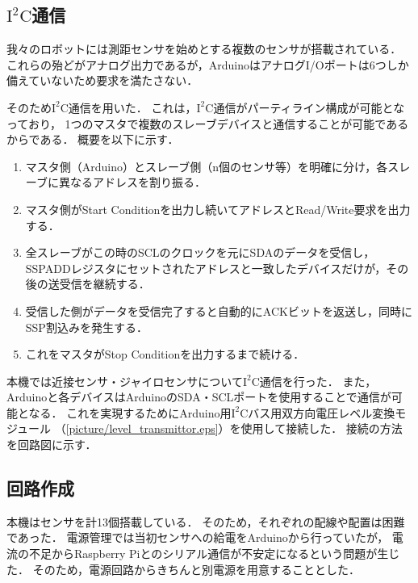 \documentclass[11pt,a4]{jsarticle}
\begin{document}

  \subsection{$\mathrm{I^2C}$通信}
    我々のロボットには測距センサを始めとする複数のセンサが搭載されている．
    これらの殆どがアナログ出力であるが，ArduinoはアナログI/Oポートは6つしか備えていないため要求を満たさない．

    そのため$\mathrm{I^2C}$通信を用いた．
    これは，$\mathrm{I^2C}$通信がパーティライン構成が可能となっており，
    1つのマスタで複数のスレーブデバイスと通信することが可能であるからである．
    概要を以下に示す．
    \begin{enumerate}
      \item マスタ側（Arduino）とスレーブ側（n個のセンサ等）を明確に分け，各スレーブに異なるアドレスを割り振る．
      \item マスタ側がStart Conditionを出力し続いてアドレスとRead/Write要求を出力する．
      \item 全スレーブがこの時のSCLのクロックを元にSDAのデータを受信し，SSPADDレジスタにセットされたアドレスと一致したデバイスだけが，その後の送受信を継続する．
      \item 受信した側がデータを受信完了すると自動的にACKビットを返送し，同時にSSP割込みを発生する．
      \item これをマスタがStop Conditionを出力するまで続ける．
    \end{enumerate}

    本機では近接センサ・ジャイロセンサについて$\mathrm{I^2C}$通信を行った．
    また，Arduinoと各デバイスはArduinoのSDA・SCLポートを使用することで通信が可能となる．
    これを実現するためにArduino用$\mathrm{I^2C}$バス用双方向電圧レベル変換モジュール
    （\ref{picture/level_transmittor.eps}）を使用して接続した．
    接続の方法を回路図に示す．


  \subsection{回路作成}
    本機はセンサを計13個搭載している．
    そのため，それぞれの配線や配置は困難であった．
    電源管理では当初センサへの給電をArduinoから行っていたが，
    電流の不足からRaspberry Piとのシリアル通信が不安定になるという問題が生じた．
    そのため，電源回路からきちんと別電源を用意することとした．
\end{document}
